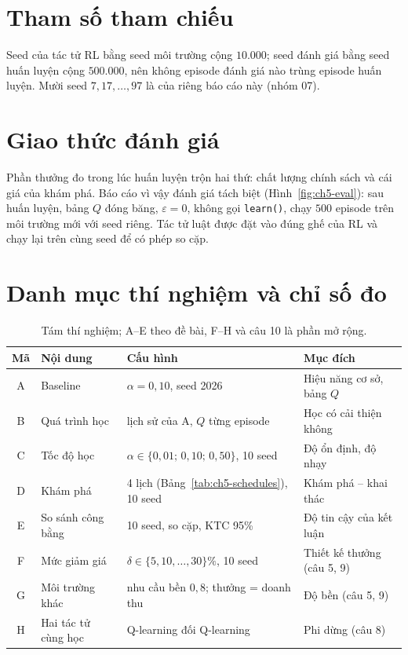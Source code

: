 \section{Tham số tham chiếu}


Seed của tác tử RL bằng seed môi trường cộng $10.000$; seed đánh giá bằng seed huấn luyện cộng $500.000$, nên
không episode đánh giá nào trùng episode huấn luyện. Mười seed $7, 17, \dots, 97$ là của riêng báo cáo này (nhóm 07).

\section{Giao thức đánh giá}\label{sec:eval}

Phần thưởng đo trong lúc huấn luyện trộn hai thứ: chất lượng chính sách và cái giá của khám phá. Báo cáo vì vậy đánh
giá tách biệt (Hình~\ref{fig:ch5-eval}): sau huấn luyện, bảng $Q$ đóng băng, $\varepsilon=0$, không gọi
\texttt{learn()}, chạy $500$ episode trên môi trường mới với seed riêng. Tác tử luật được đặt vào đúng ghế của RL và
chạy lại trên cùng seed để có phép so cặp.



\section{Danh mục thí nghiệm và chỉ số đo}

\begin{table}[!htbp]\centering\caption{Tám thí nghiệm; A--E theo đề bài, F--H và câu 10 là phần mở rộng.}\label{tab:ch5-exp}
{\small\begin{tabular}{clL{5.2cm}L{4.4cm}}
\toprule
Mã & Nội dung & Cấu hình & Mục đích \\
\midrule
A & Baseline & $\alpha=0{,}10$, seed 2026 & Hiệu năng cơ sở, bảng $Q$ \\
B & Quá trình học & lịch sử của A, $Q$ từng episode & Học có cải thiện không \\
C & Tốc độ học & $\alpha\in\{0{,}01;\,0{,}10;\,0{,}50\}$, 10 seed & Độ ổn định, độ nhạy \\
D & Khám phá & 4 lịch (Bảng~\ref{tab:ch5-schedules}), 10 seed & Khám phá -- khai thác \\
E & So sánh công bằng & 10 seed, so cặp, KTC 95\% & Độ tin cậy của kết luận \\
F & Mức giảm giá & $\delta\in\{5,10,\dots,30\}\%$, 10 seed & Thiết kế thưởng (câu 5, 9) \\
G & Môi trường khác & nhu cầu bền $0{,}8$; thưởng = doanh thu & Độ bền (câu 5, 9) \\
H & Hai tác tử cùng học & Q-learning đối Q-learning & Phi dừng (câu 8) \\
\bottomrule
\end{tabular}}
\end{table}


